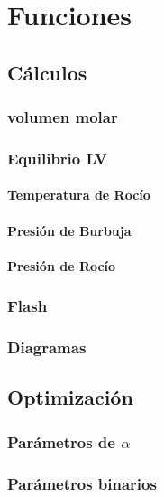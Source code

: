 \chapter{Funciones}
	\section{Cálculos}

		
		
		
		
		
		

		\subsection{volumen molar}
		\subsection{Equilibrio LV}
		

		\subsubsection{Temperatura de Rocío}
			\subsubsection{Presión de Burbuja}
		\subsubsection{Presión de Rocío}
		\subsection{Flash}
		

		
		\subsection{Diagramas}
	\section{Optimización}	
		\subsection{Parámetros de $\alpha$}
		\subsection{Parámetros binarios}
